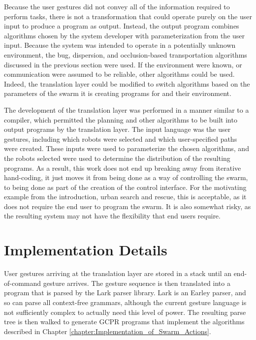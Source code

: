 Because the user gestures did not convey all of the information required to perform tasks, there is not a transformation that could operate purely on the user input to produce a program as output. 
Instead, the output program combines algorithms chosen by the system developer with parameterization from the user input. 
Because the system was intended to operate in a potentially unknown environment, the bug, dispersion, and occlusion-based transportation algorithms discussed in the previous section were used. 
If the environment were known, or communication were assumed to be reliable, other algorithms could be used. 
Indeed, the translation layer could be modified to switch algorithms based on the parameters of the swarm it is creating programs for and their environment. 

The development of the translation layer was performed in a manner similar to a compiler, which permitted the planning and other algorithms to be built into output programs by the translation layer. 
The input language was the user gestures, including which robots were selected and which user-specified paths were created. 
These inputs were used to parameterize the chosen algorithms, and the robots selected were used to determine the distribution of the resulting programs.
As a result, this work does not end up breaking away from iterative hand-coding, it just moves it from being done as a way of controlling the swarm, to being done as part of the creation of the control interface. 
For the motivating example from the introduction, urban search and rescue, this is acceptable, as it does not require the end user to program the swarm. 
It is also somewhat risky, as the resulting system may not have the flexibility that end users require. 

\section{Implementation Details}

User gestures arriving at the translation layer are stored in a stack until an end-of-command gesture arrives. 
The gesture sequence is then translated into a program that is parsed by the Lark parser library. 
Lark is an Earley parser, and so can parse all context-free grammars, although the current gesture language is not sufficiently complex to actually need this level of power. 
The resulting parse tree is then walked to generate GCPR programs that implement the algorithms described in Chapter \ref{chapter:Implementation_of_Swarm_Actions}.

